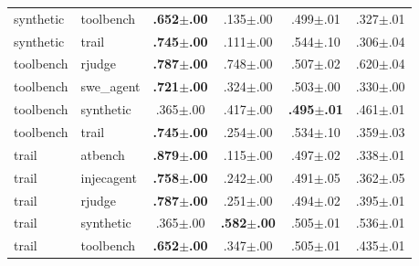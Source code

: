 \begin{table}[h]
\begin{tabular}{@{}llcccc@{}}
synthetic & toolbench & \textbf{.652$\pm$.00} & .135$\pm$.00 & .499$\pm$.01 & .327$\pm$.01 \\
synthetic & trail & \textbf{.745$\pm$.00} & .111$\pm$.00 & .544$\pm$.10 & .306$\pm$.04 \\
toolbench & rjudge & \textbf{.787$\pm$.00} & .748$\pm$.00 & .507$\pm$.02 & .620$\pm$.04 \\
toolbench & swe_agent & \textbf{.721$\pm$.00} & .324$\pm$.00 & .503$\pm$.00 & .330$\pm$.00 \\
toolbench & synthetic & .365$\pm$.00 & .417$\pm$.00 & \textbf{.495$\pm$.01} & .461$\pm$.01 \\
toolbench & trail & \textbf{.745$\pm$.00} & .254$\pm$.00 & .534$\pm$.10 & .359$\pm$.03 \\
trail & atbench & \textbf{.879$\pm$.00} & .115$\pm$.00 & .497$\pm$.02 & .338$\pm$.01 \\
trail & injecagent & \textbf{.758$\pm$.00} & .242$\pm$.00 & .491$\pm$.05 & .362$\pm$.05 \\
trail & rjudge & \textbf{.787$\pm$.00} & .251$\pm$.00 & .494$\pm$.02 & .395$\pm$.01 \\
trail & synthetic & .365$\pm$.00 & \textbf{.582$\pm$.00} & .505$\pm$.01 & .536$\pm$.01 \\
trail & toolbench & \textbf{.652$\pm$.00} & .347$\pm$.00 & .505$\pm$.01 & .435$\pm$.01 \\
\bottomrule
\end{tabular}
\end{table}